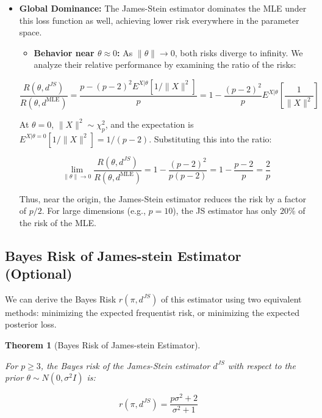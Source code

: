 \documentclass[
  letterpaper,
  DIV=11,
  numbers=noendperiod]{scrreprt}
\providecommand{\tightlist}{%
  \setlength{\itemsep}{0pt}\setlength{\parskip}{0pt}}
\renewcommand{\[}{\begin{equation}}
\renewcommand{\]}{\end{equation}}
\theoremstyle{definition}
\theoremstyle{plain}
\theoremstyle{plain}
\theoremstyle{plain}
\newtheorem{theorem}{Theorem}[chapter]
\theoremstyle{definition}
\theoremstyle{plain}
\theoremstyle{remark}
\begin{document}
\begin{itemize}
\item
  \textbf{Global Dominance:} The James-Stein estimator dominates the MLE
  under this loss function as well, achieving lower risk everywhere in
  the parameter space.

  \begin{itemize}
  \tightlist
  \item
    \textbf{Behavior near \(\theta \approx 0\):} As
    \(\lVert \theta \rVert \to 0\), both risks diverge to infinity. We
    analyze their relative performance by examining the ratio of the
    risks:
  \end{itemize}

  \[
  \frac{R(\theta, d^{JS})}{R(\theta, d^{\text{MLE}})} = \frac{p - (p-2)^2 E^{X|\theta} [1/\lVert X \rVert^2]}{p} = 1 - \frac{(p-2)^2}{p} E^{X|\theta} \left[ \frac{1}{\lVert X \rVert^2} \right]
  \]

  At \(\theta = 0\), \(\lVert X \rVert^2 \sim \chi^2_p\), and the
  expectation is \(E^{X|\theta=0}[1/\lVert X \rVert^2] = 1/(p-2)\).
  Substituting this into the ratio:

  \[
  \lim_{\lVert \theta \rVert \to 0} \frac{R(\theta, d^{JS})}{R(\theta, d^{\text{MLE}})} = 1 - \frac{(p-2)^2}{p(p-2)} = 1 - \frac{p-2}{p} = \frac{2}{p}
  \]

  Thus, near the origin, the James-Stein estimator reduces the risk by a
  factor of \(p/2\). For large dimensions (e.g., \(p=10\)), the JS
  estimator has only \(20\%\) of the risk of the MLE.
\end{itemize}

\subsection{Bayes Risk of James-stein Estimator
(Optional)}\label{bayes-risk-of-james-stein-estimator-optional}

We can derive the Bayes Risk \(r(\pi, d^{JS})\) of this estimator using
two equivalent methods: minimizing the expected frequentist risk, or
minimizing the expected posterior loss.

\begin{theorem}[Bayes Risk of James-stein
Estimator]\protect\hypertarget{thm-js-bayes-risk}{}\label{thm-js-bayes-risk}

For \(p \ge 3\), the Bayes risk of the James-Stein estimator \(d^{JS}\)
with respect to the prior \(\theta \sim N(0, \sigma^2 I)\) is:

\[
r(\pi, d^{JS}) = \frac{p\sigma^2 + 2}{\sigma^2 + 1}
\]

\end{theorem}
\end{document}
